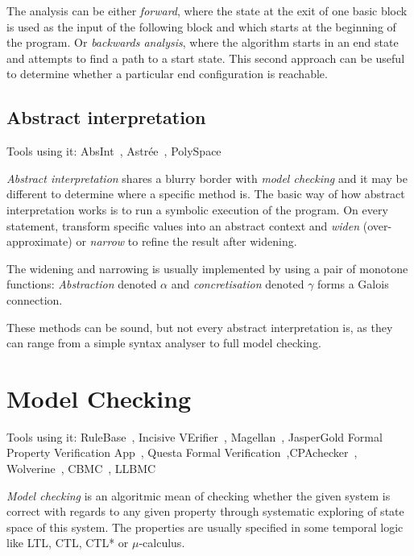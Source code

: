 The analysis can be either {\em forward}, where the state at the exit of one basic block is used as the input of the following block and which starts at the beginning of the program. Or {\em backwards analysis}, where the algorithm starts in an end state and attempts to find a path to a start state. This second approach can be useful to determine whether a particular end configuration is reachable.

\subsection{Abstract interpretation}
Tools using it: AbsInt~\cite{KrenaVojnarOverview}, Astrée~\cite{Astree1,KrenaVojnarOverview}, PolySpace~\cite{KrenaVojnarOverview}

{\em Abstract interpretation} shares a blurry border with {\em model checking} and it may be different to determine where a specific method is. The basic way of how abstract interpretation works is to run a symbolic execution of the program. On every statement, transform specific values into an abstract context and {\em widen} (over-approximate) or {\em narrow} to refine the result after widening.

The widening and narrowing is usually implemented by using a pair of monotone functions: {\em Abstraction} denoted $\alpha$ and {\em concretisation} denoted $\gamma$ forms a Galois connection.

These methods can be sound, but not every abstract interpretation is, as they can range from a simple syntax analyser to full model checking.

\section{Model Checking}\label{chap:fav:modelChecking}
Tools using it: RuleBase~\cite{KrenaVojnarOverview}, Incisive VErifier~\cite{KrenaVojnarOverview}, Magellan~\cite{KrenaVojnarOverview}, JasperGold Formal Property Verification App~\cite{KrenaVojnarOverview}, Questa Formal Verification~\cite{KrenaVojnarOverview},CPAchecker~\cite{KrenaVojnarOverview}, Wolverine~\cite{KrenaVojnarOverview}, CBMC~\cite{KrenaVojnarOverview}, LLBMC~\cite{KrenaVojnarOverview}

{\em Model checking} is an algoritmic mean of checking whether the given system is correct with regards to any given property through systematic exploring of state space of this system. The properties are usually specified in some temporal logic like LTL, CTL, CTL* or $\mu$-calculus.

